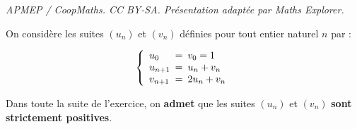 \documentclass[10pt]{article}
\begin{document}
\noindent\textit{APMEP / CoopMaths. CC BY-SA. Présentation adaptée par Maths Explorer.}\par\medskip
\medskip

On considère les suites $\left(u_n\right)$ et $\left(v_n\right)$ définies pour tout entier naturel $n$ par : 

\[\left\{\begin{array}{l !{=} l}
u_0		& v_0 = 1\\
u_{n+1}	&  u_n +v_n\\
v_{n+1}	&  2u_n + v_n
\end{array}\right.\]

Dans toute la suite de l'exercice, on \textbf{admet} que les suites $\left(u_n\right)$ et $\left(v_n\right)$ \textbf{sont strictement positives}.

\medskip
\end{document}
